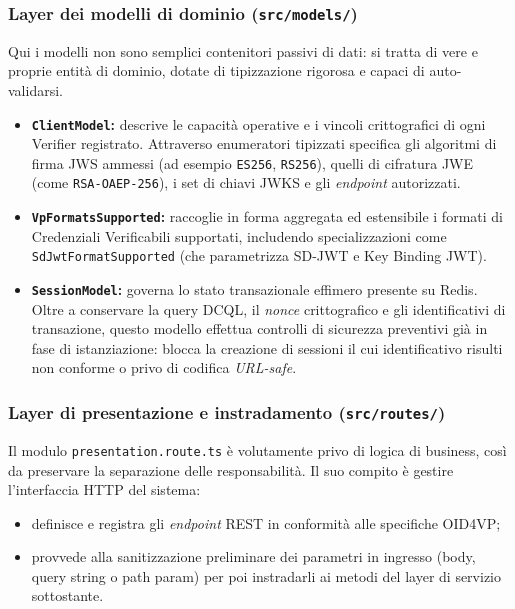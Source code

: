 \subsubsection{Layer dei modelli di dominio (\texttt{src/models/})}
Qui i modelli non sono semplici contenitori passivi di dati: si tratta di vere e proprie entità di dominio, dotate di tipizzazione rigorosa e capaci di auto-validarsi.
\begin{itemize}
    \item \textbf{\texttt{ClientModel}:} descrive le capacità operative e i vincoli crittografici di ogni Verifier registrato. Attraverso enumeratori tipizzati specifica gli algoritmi di firma JWS ammessi (ad esempio \texttt{ES256}, \texttt{RS256}), quelli di cifratura JWE (come \texttt{RSA-\allowbreak{}OAEP-\allowbreak{}256}), i set di chiavi JWKS e gli \textit{endpoint} autorizzati.
    \item \textbf{\texttt{VpFormatsSupported}:} raccoglie in forma aggregata ed estensibile i formati di Credenziali Verificabili supportati, includendo specializzazioni come \texttt{SdJwtFormatSupported} (che parametrizza SD-JWT e Key Binding JWT).
    \item \textbf{\texttt{SessionModel}:} governa lo stato transazionale effimero presente su Redis. Oltre a conservare la query DCQL, il \textit{nonce} crittografico e gli identificativi di transazione, questo modello effettua controlli di sicurezza preventivi già in fase di istanziazione: blocca la creazione di sessioni il cui identificativo risulti non conforme o privo di codifica \textit{URL-safe}.
\end{itemize}

\subsubsection{Layer di presentazione e instradamento (\texttt{src/routes/})}
Il modulo \texttt{presentation.route.ts} è volutamente privo di logica di business, così da preservare la separazione delle responsabilità. Il suo compito è gestire l'interfaccia HTTP del sistema:
\begin{itemize}
    \item definisce e registra gli \textit{endpoint} REST in conformità alle specifiche OID4VP;
    \item provvede alla sanitizzazione preliminare dei parametri in ingresso (body, query string o path param) per poi instradarli ai metodi del layer di servizio sottostante.
\end{itemize}

